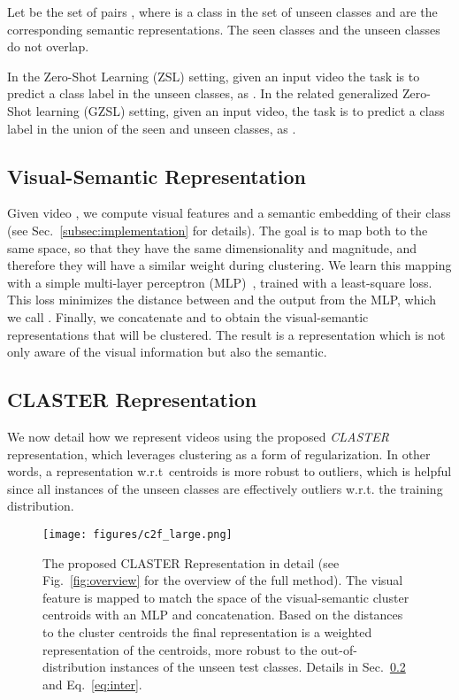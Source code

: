 \documentclass[runningheads]{llncs}
\begin{document}
Let  be the set of pairs , where  is a class in the set of unseen classes  and  are the corresponding semantic representations. The seen classes  and the unseen classes  do not overlap. 

In the Zero-Shot Learning (ZSL) setting, given an input video the task is to predict a class label in the unseen classes, as . In the related generalized Zero-Shot learning (GZSL) setting, given an input video, the task is to predict a class label in the union of the seen and unseen classes, as . 

\subsection{Visual-Semantic Representation}


Given video , we compute visual features  and a semantic embedding  of their class  (see Sec.~\ref{subsec:implementation} for details). The goal is to map both to the same space, so that they have the same dimensionality and magnitude, and therefore they will have a similar weight during clustering. We learn this mapping with a simple multi-layer perceptron (MLP)~\cite{zhang2017learning}, trained with a least-square loss. This loss minimizes the distance between  and the output from the MLP, which we call . Finally, we concatenate  and  to obtain the visual-semantic representations that will be clustered. The result is a representation which is not only aware of the visual information but also the semantic. 








\subsection{CLASTER Representation}
\label{claster_rep}
We now detail how we represent videos using the proposed \emph{CLASTER} representation, which leverages clustering as a form of regularization. In other words, a representation w.r.t~centroids is more robust to outliers, which is helpful since all instances of the unseen classes are effectively outliers w.r.t. the training distribution. 


\begin{figure}[t]
    \centering
    \texttt{[image: figures/c2f\_large.png]}
    \vspace{-3pt}
    \caption{The proposed CLASTER Representation in detail (see Fig.~\ref{fig:overview} for the overview of the full method). The visual feature is mapped to match the space of the visual-semantic cluster centroids with an MLP and concatenation. Based on the distances to the cluster centroids the final representation  is a weighted representation of the centroids, more robust to the out-of-distribution instances of the unseen test classes. Details in Sec.~\ref{claster_rep} and Eq.~\ref{eq:inter}.}\label{fig:c2f}
\end{figure}
\end{document}
